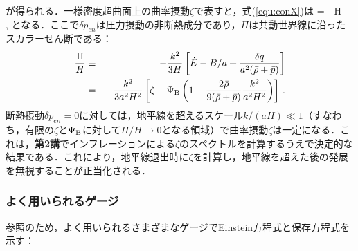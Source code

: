 が得られる．一様密度超曲面上の曲率摂動$\zeta$で表すと，式(\ref{equ:conX})は
\beq
\dot \zeta = - H  - \Pi\, ,
\eeq
となる．ここで$\delta p_{en}$は圧力摂動の非断熱成分であり，$\Pi$は共動世界線に沿ったスカラーせん断である：
\begin{eqnarray}
\frac{\Pi}{H} &\equiv& - \frac{k^2}{3H} \left[ \dot E - B/a + \frac{\delta q}{a^2(\bar \rho + \bar p)}\right] \\
&=& - \frac{k^2}{3 a^2 H^2} \left[ \zeta - \Psi_{\rm B} \left(1- \frac{2 \bar \rho}{9(\bar \rho+ \bar p)} \frac{k^2}{a^2 H^2}\right)\right]\, .
\end{eqnarray}
断熱摂動$\delta p_{en} =0$に対しては，地平線を超えるスケール$k/(aH) \ll 1$（すなわち，有限の$\zeta$と$\Psi_{\rm B}$に対して$\Pi/H \to 0$となる領域）で曲率摂動$\zeta$は一定になる．これは，\textbf{第2講}でインフレーションによる$\zeta$のスペクトルを計算するうえで決定的な結果である．これにより，地平線退出時に$\zeta$を計算し，地平線を超えた後の発展を無視することが正当化される．




\subsubsection{よく用いられるゲージ}



参照のため，よく用いられるさまざまなゲージでEinstein方程式と保存方程式を示す：



